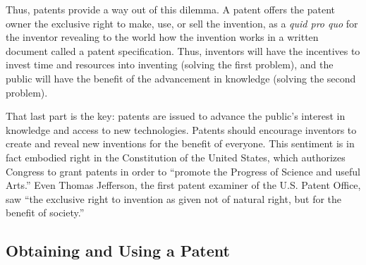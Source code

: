 \documentclass[11pt,twocolumn,titlepage]{article}
\begin{document}
Thus, patents provide a way out of this dilemma. A patent offers the patent
owner the exclusive right to make, use, or sell the invention, as a \emph{quid pro quo} for
the inventor revealing to the world how the invention works in a written
document called a patent specification. Thus, inventors will have the incentives
to invest time and resources into inventing (solving the first problem), and the
public will have the benefit of the advancement in knowledge (solving the second
problem).

That last part is the key: patents are issued to advance the public's interest
in knowledge and access to new technologies. Patents should encourage inventors
to create and reveal new inventions for the benefit of everyone. This sentiment
is in fact embodied right in the Constitution of the United States, which
authorizes Congress to grant patents in order to ``promote the Progress of
Science and useful Arts.'' Even Thomas Jefferson, the first
patent examiner of
the U.S. Patent Office, saw ``the exclusive right to invention as given not of
natural right, but for the benefit of society.''

\subsection{Obtaining and Using a Patent}
\SectionNote
\end{document}
